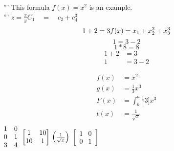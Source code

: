 \documentclass{article}
\begin{document}
  \section{}
  '''
  This formula $f(x) = x^2$ is an example.\\
  '''
  $z = \frac{x}{y}$\quad $C_1 \quad = \quad c_2 + c_4^3$\\
  \begin{equation*}
      1 + 2 = 3\\
      f(x) = x_1 + x_2^2 + x_3^3
  \end{equation*}
  \begin{equation*}
      1 = 3 - 2
  \end{equation*}
  \begin{equation*}
      1 * 8 = 8
  \end{equation*}
  \begin{align*}
      1 + 2 &= 3\\
      1 &= 3-2
  \end{align*}

  \begin{align*}
      f(x) &= x^2\\
      g(x) &= \frac{1}{3}x^3\\
      F(x) &= \int^a_b \frac{1}[3]x^3\\
      t(x) &= \frac{1}{\sqrt{x}}\\
  \end{align*}
  $\begin{matrix}
      1 & 0\\
      0 & 1\\
      3 & 4
  \end{matrix}\\
  \left[
      \begin{matrix}
          1 & 10\\
          10 & 1
      \end{matrix}
  \right]\\
  \left(\frac{1}{\sqrt{x}}\right)
$
$[
    \begin{matrix}
        1 & 0\\
        0 & 1
    \end{matrix}
]$
\end{document}
